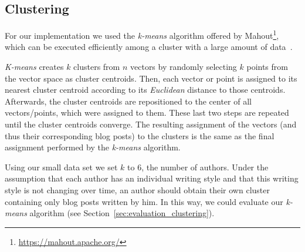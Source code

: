 \subsection{Clustering}
\label{sec:impl_clustering}

For our implementation we used the \textit{k-means} algorithm offered by Mahout\footnote{\url{https://mahout.apache.org/}}, which can be executed efficiently among a cluster with a large amount of data~\cite{esteves2011k}.


\textit{K-means} creates $k$ clusters from $n$ vectors by randomly selecting $k$ points from the vector space as cluster centroids.
Then, each vector or point is assigned to its nearest cluster centroid according to its \textit{Euclidean} distance to those centroids.
Afterwards, the cluster centroids are repositioned to the center of all vectors/points, which were assigned to them.
These last two steps are repeated until the cluster centroids converge.
The resulting assignment of the vectors (and thus their corresponding blog posts) to the clusters is the same as the final assignment performed by the \textit{k-means} algorithm.


Using our small data set we set $k$ to 6, the number of authors.
Under the assumption that each author has an individual writing style and that this writing style is not changing over time, an author should obtain their own cluster containing only blog posts written by him.
In this way, we could evaluate our \textit{k-means} algorithm (see Section~\ref{sec:evaluation_clustering}).


